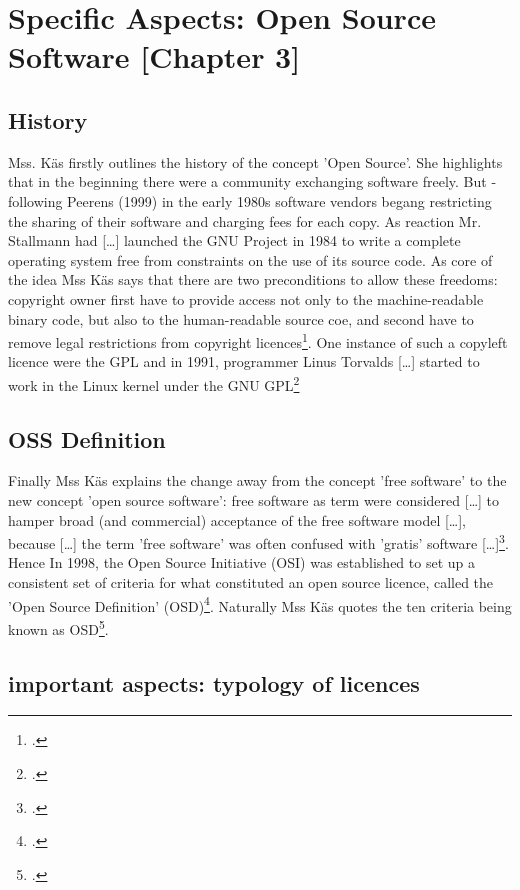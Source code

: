 \documentclass[DIV=calc,BCOR=5mm,11pt,headings=small,oneside,abstract=true, toc=bib]{scrartcl}
\begin{document}
\section{Specific Aspects: Open Source Software [Chapter 3]}

\subsection{History}
Mss. Käs firstly outlines the history of the concept 'Open Source'. She
highlights that in the beginning there were a community exchanging software
freely. But - following Peerens (1999) \glqq{}in the early 1980s software
vendors begang restricting the sharing of their software and charging
fees for each copy\grqq{}. As reaction Mr. Stallmann had \glqq{}[\ldots]
launched the GNU Project in 1984 to write a complete operating system
free from constraints on the use of its source code\grqq{}. As core of the idea
Mss Käs says that \glqq{}there are two preconditions to allow these
freedoms: copyright owner first have to provide access not only to the
machine-readable binary code, but also to the human-readable source coe,
and second have to remove legal restrictions from copyright
licences\grqq{}\footcite[cf.][59]{Kaes2008a}. One instance of such a
\glqq{}copyleft licence\grqq{} were the GPL and \glqq{}in 1991,
programmer Linus Torvalds [\ldots] started to work in the Linux kernel
under the GNU GPL\grqq{}\footcite[cf.][60]{Kaes2008a}

\subsection{OSS Definition}
Finally Mss Käs explains the change away from the concept 'free software' to the
new concept 'open source software': free software as term were considered
\glqq{}[\ldots] to hamper broad (and commercial) acceptance of the free
software model [\ldots]\grqq{}, because \glqq{}[\ldots]
the term 'free software' was often confused
with 'gratis' software [\ldots]\grqq{}\footcite[cf.][60]{Kaes2008a}. Hence
\glqq{}In 1998, the Open Source Initiative (OSI) was established to set
up a consistent set of criteria for what constituted an open source
licence, called the 'Open Source Definition'
(OSD)\grqq{}\footcite[cf.][60]{Kaes2008a}. Naturally Mss Käs quotes the ten
criteria being known as OSD\footcite[cf.][62]{Kaes2008a}.

\subsection{important aspects: typology of licences}
\end{document}
